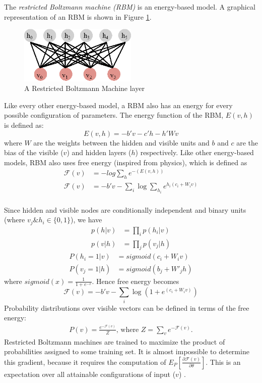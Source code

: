 The \textit{restricted Boltzmann machine (RBM)} is an energy-based model.  A graphical representation of an RBM is shown in Figure \ref{fig:rbm_layer}.

\begin{figure}[!ht]
  \centering
  \includegraphics[width=0.5\textwidth]{./imgs/rbm.eps}
  \caption{A Restricted Boltzmann Machine layer}
  \label{fig:rbm_layer}
\end{figure}%

Like every other energy-based model, a RBM also has an energy for every possible configuration of parameters.  The energy function of the RBM, $E(v,h)$ is defined as: 
$$E(v,h) = - b'v - c'h - h'Wv$$
where $W$ are the weights between the hidden and visible units and $b$ and $c$ are the bias of the visible ($v$) and hidden layers ($h$) respectively.  Like other energy-based models, RBM also uses free energy (inspired from physics), which is defined as
\begin{align*}
\mathcal{F}(v) &= -log \sum_{h}{e^{-(E(v,h))}} \\
\mathcal{F}(v) &= - b'v - \sum_i \log \sum_{h_i} e^{h_i (c_i + W_i v)}\\
\end{align*}

Since hidden and visible nodes are conditionally independent and binary units (where $v_j \& h_i \in \{0,1\}$), we have 
\begin{align}
p(h|v) &= \prod_i p(h_i|v) \\
p(v|h) &= \prod_j p(v_j|h) 
\end{align}
\begin{align}
P(h_i=1|v) &= sigmoid(c_i + W_i v) \label{eq:rbm_layers_prob1} \\
P(v_j=1|h) &= sigmoid(b_j + W'_j h) \label{eq:rbm_layers_prob2}
\end{align}
where $sigmoid(x)= \frac{1}{1 + e^{-x}}$. Hence free energy becomes
$$\mathcal{F}(v)= - b'v - \sum_i \log(1 + e^{(c_i + W_i v)})$$ %
Probability distributions over visible vectors can be defined in terms of the free energy:
\begin{align*}
P(v) = \frac{e^{-\mathcal{F}(v)}}{Z} \text{, where } Z=\sum_v e^{-\mathcal{F}(v)}.
\end{align*}
Restricted Boltzmann machines are trained to maximize the product of probabilities assigned to some training set.  It is almost impossible to determine this gradient, because it requires the computation of $E_P[\frac{\partial \mathcal{F}(v)} {\partial \theta} ]$.  This is an expectation over all attainable configurations of input ($v$) \cite{hinton2010practical}.

